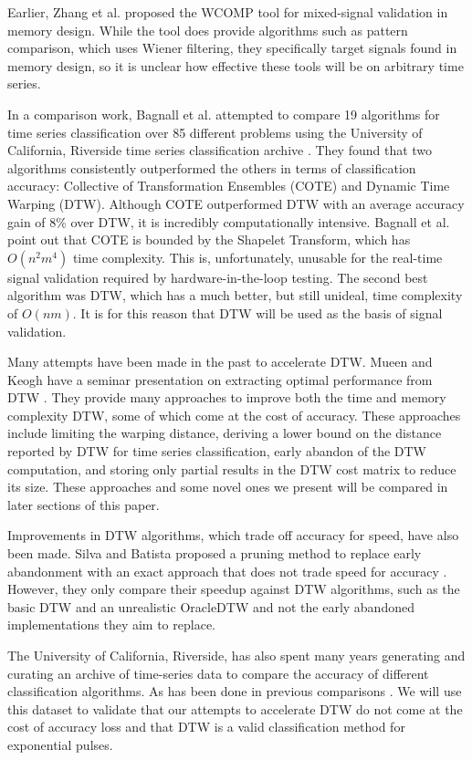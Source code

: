 \documentclass[sigconf,authordraft]{acmart}
\begin{document}
Earlier, Zhang et al. \cite{SIG:WCOMP} proposed the WCOMP tool for mixed-signal validation in memory design. While the tool does provide algorithms such as pattern comparison, which uses Wiener filtering, they specifically target signals found in memory design, so it is unclear how effective these tools will be on arbitrary time series.

In a comparison work, Bagnall et al. \cite{SIG:TimeSeriesCompare} attempted to compare 19 algorithms for time series classification over 85 different problems using the University of California, Riverside time series classification archive \cite{SIG:UCRArchive2018}. They found that two algorithms consistently outperformed the others in terms of classification accuracy: Collective of Transformation Ensembles (COTE) and Dynamic Time Warping (DTW). Although COTE outperformed DTW with an average accuracy gain of 8\% over DTW, it is incredibly computationally intensive. Bagnall et al. point out that COTE is bounded by the Shapelet Transform, which has \(O(n^2m^4) \) time complexity. This is, unfortunately, unusable for the real-time signal validation required by hardware-in-the-loop testing. The second best algorithm was DTW, which has a much better, but still unideal, time complexity of \( O(nm) \). It is for this reason that DTW will be used as the basis of signal validation.

Many attempts have been made in the past to accelerate DTW. Mueen and Keogh have a seminar presentation on extracting optimal performance from DTW \cite{SIG:AccelerateDTW}. They provide many approaches to improve both the time and memory complexity DTW, some of which come at the cost of accuracy. These approaches include limiting the warping distance, deriving a lower bound on the distance reported by DTW for time series classification, early abandon of the DTW computation, and storing only partial results in the DTW cost matrix to reduce its size. These approaches and some novel ones we present will be compared in later sections of this paper.

Improvements in DTW algorithms, which trade off accuracy for speed, have also been made. Silva and Batista proposed a pruning method to replace early abandonment with an exact approach that does not trade speed for accuracy \cite{SIG:PruneDTW}. However, they only compare their speedup against DTW algorithms, such as the basic DTW and an unrealistic OracleDTW and not the early abandoned implementations they aim to replace.

The University of California, Riverside, has also spent many years generating and curating an archive of time-series data to compare the accuracy of different classification algorithms. As has been done in previous comparisons \cite{SIG:TimeSeriesCompare}. We will use this dataset to validate that our attempts to accelerate DTW do not come at the cost of accuracy loss and that DTW is a valid classification method for exponential pulses.
\end{document}
